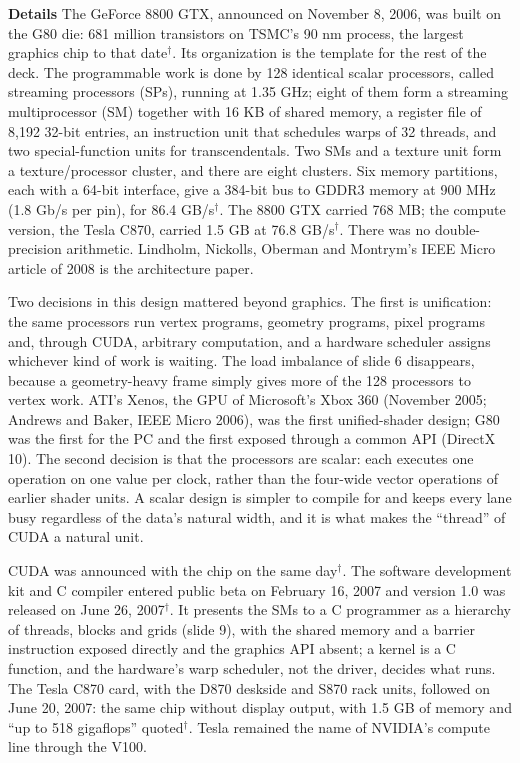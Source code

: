 \documentclass[11pt,letterpaper]{article}
\newcommand{\para}[1]{\medskip\noindent\textbf{#1}\quad}
\begin{document}
\para{Details} The GeForce 8800 GTX, announced on November 8, 2006, was built on the G80 die: 681 million transistors on TSMC's 90 nm process, the largest graphics chip to that date$^\dagger$. Its organization is the template for the rest of the deck. The programmable work is done by 128 identical scalar processors, called streaming processors (SPs), running at 1.35 GHz; eight of them form a streaming multiprocessor (SM) together with 16 KB of shared memory, a register file of 8{,}192 32-bit entries, an instruction unit that schedules warps of 32 threads, and two special-function units for transcendentals. Two SMs and a texture unit form a texture/processor cluster, and there are eight clusters. Six memory partitions, each with a 64-bit interface, give a 384-bit bus to GDDR3 memory at 900 MHz (1.8 Gb/s per pin), for 86.4 GB/s$^\dagger$. The 8800 GTX carried 768 MB; the compute version, the Tesla C870, carried 1.5 GB at 76.8 GB/s$^\dagger$. There was no double-precision arithmetic. Lindholm, Nickolls, Oberman and Montrym's IEEE Micro article of 2008 is the architecture paper.

Two decisions in this design mattered beyond graphics. The first is unification: the same processors run vertex programs, geometry programs, pixel programs and, through CUDA, arbitrary computation, and a hardware scheduler assigns whichever kind of work is waiting. The load imbalance of slide 6 disappears, because a geometry-heavy frame simply gives more of the 128 processors to vertex work. ATI's Xenos, the GPU of Microsoft's Xbox 360 (November 2005; Andrews and Baker, IEEE Micro 2006), was the first unified-shader design; G80 was the first for the PC and the first exposed through a common API (DirectX 10). The second decision is that the processors are scalar: each executes one operation on one value per clock, rather than the four-wide vector operations of earlier shader units. A scalar design is simpler to compile for and keeps every lane busy regardless of the data's natural width, and it is what makes the ``thread'' of CUDA a natural unit.

CUDA was announced with the chip on the same day$^\dagger$. The software development kit and C compiler entered public beta on February 16, 2007 and version 1.0 was released on June 26, 2007$^\dagger$. It presents the SMs to a C programmer as a hierarchy of threads, blocks and grids (slide 9), with the shared memory and a barrier instruction exposed directly and the graphics API absent; a kernel is a C function, and the hardware's warp scheduler, not the driver, decides what runs. The Tesla C870 card, with the D870 deskside and S870 rack units, followed on June 20, 2007: the same chip without display output, with 1.5 GB of memory and ``up to 518 gigaflops'' quoted$^\dagger$. Tesla remained the name of NVIDIA's compute line through the V100.
\end{document}
